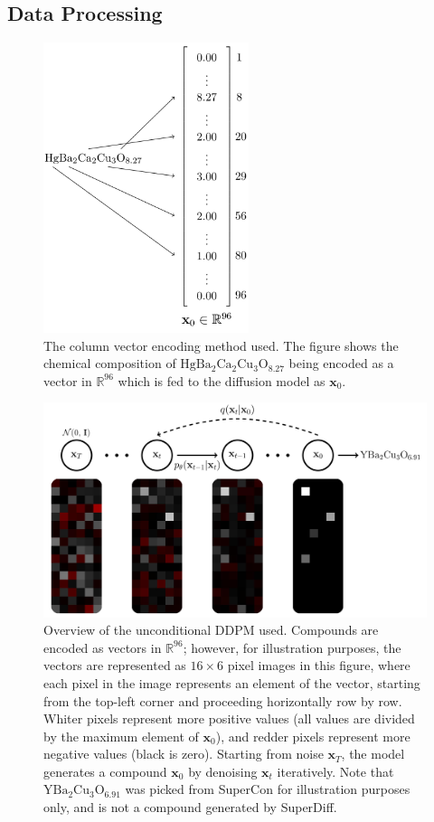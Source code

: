 \documentclass[%
reprint,
 amsmath,amssymb,
 aps,
prb,
]{revtex4-2}
\begin{document}
\subsection{Data Processing}
\label{sec:dataprocess}

\begin{figure}
    \centering
    \includegraphics[width = 6cm]{superdiffvectorencodev2.png}
    \caption{The column vector encoding method used. The figure shows the chemical composition of $\mathrm{HgBa_2Ca_2Cu_3O_{8.27}}$ being encoded as a vector in $\mathbb{R}^{96}$ which is fed to the diffusion model as $\mathbf{x}_0$.}
    \label{fig:compoundencoding}
\end{figure}

\begin{figure}
        \centering
        \includegraphics[width = 14cm]{correctednewdiff.png}
        \caption{Overview of the unconditional DDPM used. Compounds are encoded as vectors in $\mathbb{R}^{96}$; however, for illustration purposes, the vectors are represented as $16 \times 6$ pixel images in this figure, where each pixel in the image represents an element of the vector, starting from the top-left corner and proceeding horizontally row by row. Whiter pixels represent more positive values (all values are divided by the maximum element of $\mathbf{x}_0$), and redder pixels represent more negative values (black is zero). Starting from noise $\mathbf{x}_T$, the model generates a compound $\mathbf{x}_0$ by denoising $\mathbf{x}_t$ iteratively. Note that $\mathrm{YBa_{2}Cu_{3}O_{6.91}}$ was picked from SuperCon for illustration purposes only, and is not a compound generated by SuperDiff.}
        \label{fig:diffarch}
\end{figure}
\end{document}
